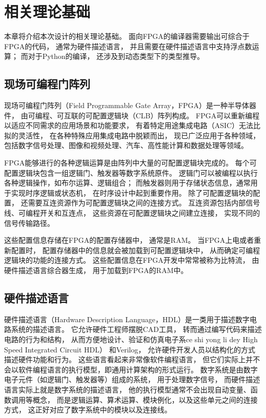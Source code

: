 \section{相关理论基础}

本章将介绍本次设计的相关理论基础。
面向FPGA的编译器需要输出可综合于FPGA的代码，
通常为硬件描述语言，
并且需要在硬件描述语言中支持浮点数运算；
而对于Python的编译，
还涉及到动态类型下的类型推导。

\subsection{现场可编程门阵列}

现场可编程门阵列（Field Programmable Gate Array，FPGA）是一种半导体器件，
由可编程、可互联的可配置逻辑块（CLB）阵列构成。
FPGA可以重新编程以适应不同需求的应用场景和功能要求，
有着特定用途集成电路（ASIC）无法比拟的灵活性，
在各种特殊应用集成电路中脱颖而出，
现已广泛应用于各种领域，
包括数字信号处理、图像和视频处理、汽车、高性能计算和数据处理等领域。

FPGA能够进行的各种逻辑运算是由阵列中大量的可配置逻辑块完成的。
每个可配置逻辑块包含一组逻辑门、触发器等数字系统原件。
逻辑门可以被编程以执行各种逻辑操作，如布尔运算、逻辑组合；
而触发器则用于存储状态信息，通常用于实现时序逻辑或状态机，
在时序设计中起到重要作用。
除了可配置逻辑块的配置，
还需要互连资源作为可配置逻辑块之间的连接方式。
互连资源包括内部信号线、可编程开关和互连点，
这些资源在可配置逻辑块之间建立连接，
实现不同的信号传输路径。

这些配置信息存储在FPGA的配置存储器中，
通常是RAM。
当FPGA上电或者重新配置时，
配置存储器中的信息就会被加载到可配置逻辑块中，
从而确定可编程逻辑块的功能的连接方式。
这些配置信息在FPGA开发中常常被称为比特流，
由硬件描述语言综合器生成，
用于加载到FPGA的RAM中。

\subsection{硬件描述语言}

硬件描述语言（Hardware Description Language，HDL）是一类用于描述数字电路系统的描述语言。
它允许硬件工程师摆脱CAD工具，
转而通过编写代码来描述电路的行为和结构，
从而方便地设计、验证和仿真电子系ce shi yong li dey High Speed Integrated Circuit HDL）
和Verilog，
允许硬件开发人员以结构化的方式描述硬件功能和行为。
这些语言看起来非常像软件编程语言，
但它们实际上并不会以软件编程语言的执行模型，即通用计算架构的形式运行。
数字系统是由数字电子元件（如逻辑门、触发器等）组成的系统，
用于处理数字信号，
而硬件描述语言实际上就是数字系统的描述语言，
他的执行模型通常不会出现自动变量、函数调用等概念，
而是逻辑运算、算术运算、模块例化，以及这些单元之间的连接方式，
这正好对应了数字系统中的模块以及连接线。

